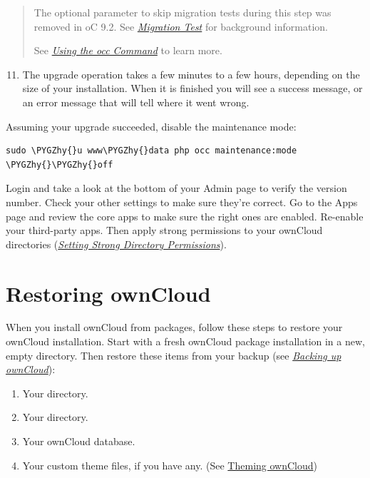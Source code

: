\documentclass[letterpaper,10pt,english]{sphinxmanual}
\def\PYGZhy{\char`\-}
\begin{document}
\begin{quote}

The optional parameter to skip migration tests during this step was removed in oC 9.2.
See {\hyperref[maintenance/upgrade:migration-test-label]{\emph{Migration Test}}} for background information.

See {\hyperref[configuration_server/occ_command::doc]{\emph{Using the occ Command}}} to learn more.
\end{quote}
\begin{enumerate}
\setcounter{enumi}{10}
\item {} 
The upgrade operation takes a few minutes to a few hours, depending on the
size of your installation. When it is finished you will see a success
message, or an error message that will tell where it went wrong.

\end{enumerate}

Assuming your upgrade succeeded, disable the maintenance mode:

\begin{Verbatim}[commandchars=\\\{\}]
sudo \PYGZhy{}u www\PYGZhy{}data php occ maintenance:mode \PYGZhy{}\PYGZhy{}off
\end{Verbatim}

Login and take a look at the bottom of your Admin page to
verify the version number. Check your other settings to make sure they're
correct. Go to the Apps page and review the core apps to make sure the right
ones are enabled. Re-enable your third-party apps. Then apply strong
permissions to your ownCloud directories ({\hyperref[installation/installation_wizard:strong-perms-label]{\emph{Setting Strong Directory Permissions}}}).


\section{Restoring ownCloud}
\label{maintenance/restore::doc}\label{maintenance/restore:owncloud-org-install}\label{maintenance/restore:restoring-owncloud}
When you install ownCloud from packages, follow these steps to restore your ownCloud installation. Start with a fresh ownCloud package installation in a new, empty directory. Then restore these items from your backup (see {\hyperref[maintenance/backup::doc]{\emph{Backing up ownCloud}}}):
\begin{enumerate}
\item {} 
Your  directory.

\item {} 
Your  directory.

\item {} 
Your ownCloud database.

\item {} 
Your custom theme files, if you have any. (See \href{https://doc.owncloud.org/server/9.2/developer\_manual/core/theming.html}{Theming ownCloud})

\end{enumerate}
\end{document}
